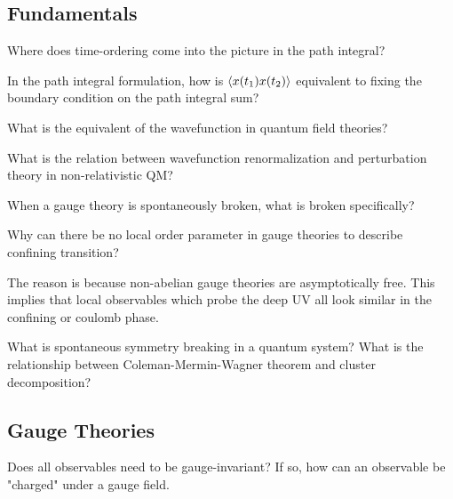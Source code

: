 \documentclass[11pt]{scrartcl}
\begin{document}
\subsection{Fundamentals}

\begin{myquestion}
	Where does time-ordering come into the picture in the path integral?
	\end{myquestion}

\begin{myquestion}
	In the path integral formulation, how is $\braket{x(t_1) x(t_2)}$ equivalent to fixing the boundary condition on the path integral sum?
	\end{myquestion}

\begin{myquestion}
	What is the equivalent of the wavefunction in quantum field theories?
	\end{myquestion}

\begin{myquestion}
	What is the relation between wavefunction renormalization and perturbation theory in non-relativistic QM?
	\end{myquestion}

\begin{myquestion}
	When a gauge theory is spontaneously broken, what is broken specifically?  
\end{myquestion}

\begin{myquestion}
	Why can there be no local order parameter in gauge theories to describe confining transition? 
\end{myquestion}

The reason is because non-abelian gauge theories are asymptotically free.  This implies that local observables which probe the deep UV all look similar in the confining or coulomb phase.


\begin{myquestion}
	What is spontaneous symmetry breaking in a quantum system?  What is the relationship between Coleman-Mermin-Wagner theorem and cluster decomposition?
	\end{myquestion}




\subsection{Gauge Theories}
\begin{myquestion}
	Does all observables need to be gauge-invariant?  If so, how can an observable be "charged" under a gauge field.
\end{myquestion}
\end{document}
